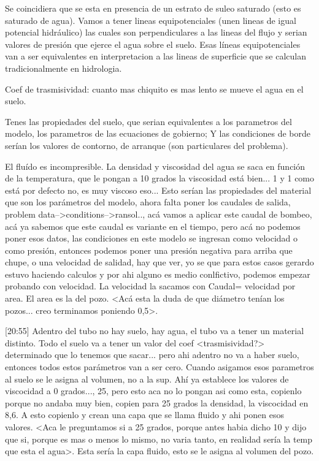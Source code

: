 \documentclass[10pt,a4paper,final]{article}
\begin{document}
Se coincidiera que se esta en presencia de un estrato de suleo saturado (esto es saturado de agua). 
Vamos a tener lineas equipotenciales (unen lineas de igual potencial hidráulico) las cuales son perpendiculares a las lineas del flujo y serian valores de presión que ejerce el agua sobre el suelo. Esas líneas equipotenciales van a ser equivalentes en interpretacion a las lineas de superficie que se calculan tradicionalmente en hidrologia.

Coef de trasmisividad: cuanto mas chiquito es mas lento se mueve el agua en el suelo.

Tenes las propiedades del suelo, que serian equivalentes a los parametros del modelo, los parametros de las ecuaciones de gobierno; Y las condiciones de borde serían los valores de contorno, de arranque (son particulares del problema).

El fluído es incompresible. La densidad y viscosidad del agua se saca en función de la temperatura, que le pongan a 10 grados la viscosidad está bien... 1 y 1 como está por defecto no, es muy viscoso eso... Esto serían las propiedades del material que son los parámetros del modelo, ahora falta poner los caudales de salida, problem data-->conditions-->ransol.., acá vamos a aplicar este caudal de bombeo, acá ya sabemos que este caudal es variante en el tiempo, pero acá no podemos poner esos datos, las condiciones en este modelo se ingresan como velocidad o como presión, entonces podemos poner una presión negativa para arriba que chupe, o una velocidad de salidad, hay que ver, yo se que para estos casos gerardo estuvo haciendo calculos y por ahi alguno es medio conlfictivo, podemos empezar probando con velocidad. La velocidad la sacamos con Caudal= velocidad por area. El area es la del pozo. <Acá esta la duda de que diámetro tenían los pozos... creo terminamos poniendo 0,5>. 

[20:55]
Adentro del tubo no hay suelo, hay agua, el tubo va a tener un material distinto. Todo el suelo va a tener un valor del coef <trasmisividad?> determinado que lo tenemos que sacar... pero ahi adentro no va a haber suelo, entonces todos estos parámetros van a ser cero. Cuando asigamos esos parametros al suelo se le asigna al volumen, no a la sup. Ahí ya establece los valores de viscocidad a 0 grados..., 25, pero esto aca no lo pongan asi como esta, copienlo porque no andaba muy bien, copien para 25 grados la densidad, la viscocidad en 8,6. A esto copienlo y crean una capa que se llama fluido y ahi ponen esos valores. <Aca le preguntamos si a 25 grados, porque antes habia dicho 10 y dijo que si, porque es mas o menos lo mismo, no varia tanto, en realidad sería la temp que esta el agua>. Esta sería la capa fluido, esto se le asigna al volumen del pozo.
\end{document}
